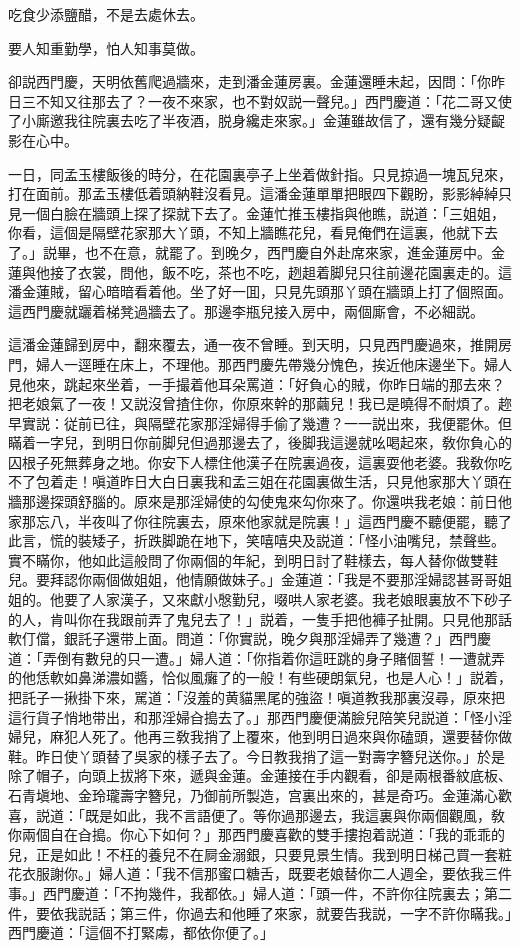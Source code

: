 \begin{myquote}
吃食少添鹽醋，不是去處休去。

要人知重勤學，怕人知事莫做。
\end{myquote}

卻説西門慶，天明依舊爬過牆來，走到潘金蓮房裏。金蓮還睡未起，因問：「你昨日三不知又往那去了？一夜不來家，也不對奴説一聲兒。」西門慶道：「花二哥又使了小廝邀我往院裏去吃了半夜酒，脱身纔走來家。」金蓮雖故信了，還有幾分疑齪影在心中。

一日，同孟玉樓飯後的時分，在花園裏亭子上坐着做針指。只見掠過一塊瓦兒來，打在面前。那孟玉樓低着頭納鞋沒看見。這潘金蓮單單把眼四下觀盼，影影綽綽只見一個白臉在牆頭上探了探就下去了。金蓮忙推玉樓指與他瞧，説道：「三姐姐，你看，這個是隔壁花家那大丫頭，不知上牆瞧花兒，看見俺們在這裏，他就下去了。」説畢，也不在意，就罷了。到晚夕，西門慶自外赴席來家，進金蓮房中。金蓮與他接了衣裳，問他，飯不吃，茶也不吃，趔趄着脚兒只往前邊花園裏走的。這潘金蓮賊，留心暗暗看着他。坐了好一囬，只見先頭那丫頭在牆頭上打了個照面。這西門慶就躧着梯凳過牆去了。那邊李瓶兒接入房中，兩個廝會，不必細説。

這潘金蓮歸到房中，翻來覆去，通一夜不曾睡。到天明，只見西門慶過來，推開房門，婦人一逕睡在床上，不理他。那西門慶先帶幾分愧色，挨近他床邊坐下。婦人見他來，跳起來坐着，一手撮着他耳朵罵道：「好負心的賊，你昨日端的那去來？把老娘氣了一夜！又説沒曾揸住你，你原來幹的那繭兒！我已是曉得不耐煩了。趂早實説：従前已往，與隔壁花家那淫婦得手偷了幾遭？一一説出來，我便罷休。但瞞着一字兒，到明日你前脚兒但過那邊去了，後脚我這邊就吆喝起來，敎你負心的囚根子死無葬身之地。你安下人標住他漢子在院裏過夜，這裏耍他老婆。我敎你吃不了包着走！嗔道昨日大白日裏我和孟三姐在花園裏做生活，只見他家那大丫頭在牆那邊探頭舒腦的。原來是那淫婦使的勾使鬼來勾你來了。你還哄我老娘：前日他家那忘八，半夜叫了你往院裏去，原來他家就是院裏！」這西門慶不聽便罷，聽了此言，慌的裝矮子，折跌脚跪在地下，笑嘻嘻央及説道：「怪小油嘴兒，禁聲些。實不瞞你，他如此這般問了你兩個的年紀，到明日討了鞋樣去，每人替你做雙鞋兒。要拜認你兩個做姐姐，他情願做妹子。」金蓮道：「我是不要那淫婦認甚哥哥姐姐的。他要了人家漢子，又來獻小慇勤兒，啜哄人家老婆。我老娘眼裏放不下砂子的人，肯叫你在我跟前弄了鬼兒去了！」説着，一隻手把他褲子扯開。只見他那話軟仃儅，銀託子還带上面。問道：「你實説，晚夕與那淫婦弄了幾遭？」西門慶道：「弄倒有數兒的只一遭。」婦人道：「你指着你這旺跳的身子賭個誓！一遭就弄的他恁軟如鼻涕濃如醬，恰似風癱了的一般！有些硬朗氣兒，也是人心！」説着，把託子一揪掛下來，駡道：「沒羞的黄貓黑尾的強盜！嗔道教我那裏沒尋，原來把這行貨子悄地带出，和那淫婦㒲搗去了。」那西門慶便滿臉兒陪笑兒説道：「怪小淫婦兒，麻犯人死了。他再三敎我捎了上覆來，他到明日過來與你磕頭，還要替你做鞋。昨日使丫頭替了吳家的樣子去了。今日教我捎了這一對壽字簪兒送你。」於是除了帽子，向頭上拔將下來，遞與金蓮。金蓮接在手内觀看，卻是兩根番紋底板、石青塡地、金玲瓏壽字簪兒，乃御前所製造，宫裏出來的，甚是奇巧。金蓮滿心歡喜，説道：「既是如此，我不言語便了。等你過那邊去，我這裏與你兩個觀風，敎你兩個自在㒲搗。你心下如何？」那西門慶喜歡的雙手摟抱着説道：「我的乖乖的兒，正是如此！不枉的養兒不在屙金溺銀，只要見景生情。我到明日梯己買一套粧花衣服謝你。」婦人道：「我不信那蜜口糖舌，既要老娘替你二人週全，要依我三件事。」西門慶道：「不拘幾件，我都依。」婦人道：「頭一件，不許你往院裏去；第二件，要依我説話；第三件，你過去和他睡了來家，就要告我説，一字不許你瞞我。」西門慶道：「這個不打緊䖏，都依你便了。」

